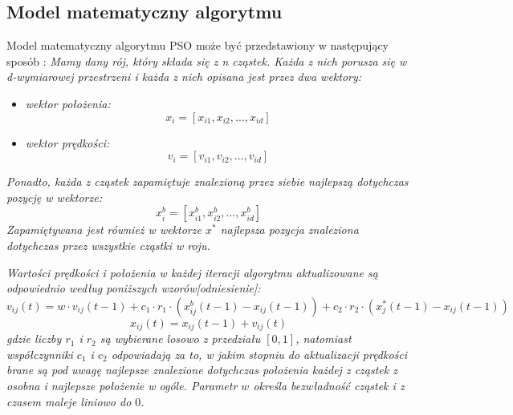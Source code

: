 \subsection{Model matematyczny algorytmu}
Model matematyczny algorytmu PSO może być przedstawiony w następujący sposób \cite{PSO2}:
\newline
\textit{Mamy dany rój, który składa się z n cząstek. Każda z nich porusza się w d-wymiarowej przestrzeni i każda z nich opisana jest przez dwa wektory:}

\begin{itemize}
\item\textit{wektor położenia:}
\newline
\begin{equation}
x_i = [x_{i1},x_{i2},...,x_{id}]
\end{equation}
\newline
\item\textit{wektor prędkości:}
\newline
\begin{equation}
v_i = [v_{i1},v_{i2},...,v_{id}]
\end{equation}
\newline
\end{itemize}

\textit{Ponadto, każda z cząstek zapamiętuje znalezioną przez siebie najlepszą dotychczas pozycję w wektorze:}
\newline
\begin{equation}
x_i^b=[x_{i1}^b,x_{i2}^b,...,x_{id}^b]
\end{equation} 
\newline
\textit{Zapamiętywana jest również w wektorze $x^*$ najlepsza pozycja znaleziona dotychczas przez wszystkie cząstki w roju.}

\textit{Wartości prędkości i położenia w każdej iteracji algorytmu aktualizowane są odpowiednio według poniższych wzorów[odniesienie]:}
\newline
\begin{equation}
v_{ij}(t)=w \cdot v_{ij}(t-1)+c_1\cdot r_1 \cdot (x_{ij}^b(t-1)-x_{ij}(t-1))+c_2 \cdot r_2 \cdot (x_j^*(t-1)-x_{ij}(t-1))
\end{equation}
\newline
\begin{equation}
x_{ij}(t)=x_{ij}(t-1)+v_{ij}(t)
\end{equation}
\newline
\textit{gdzie liczby $r_1$ i $r_2$ są wybierane losowo z przedziału $[0,1]$, natomiast współczynniki $c_1$ i $c_2$ odpowiadają za to, w jakim stopniu do aktualizacji prędkości brane są pod uwagę najlepsze znalezione dotychczas położenia każdej z cząstek z osobna i najlepsze położenie w ogóle. Parametr $w$ określa bezwładność cząstek i z czasem maleje liniowo do $0$.}

